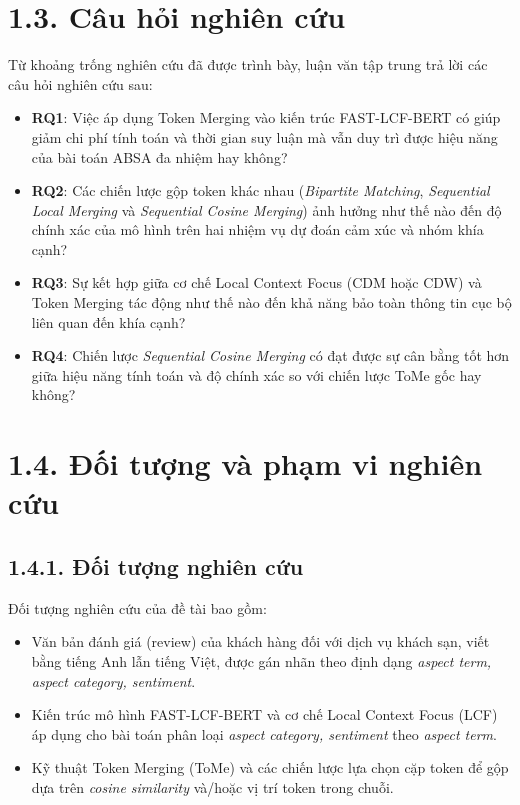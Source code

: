 \section{1.3. Câu hỏi nghiên cứu}

Từ khoảng trống nghiên cứu đã được trình bày, luận văn tập trung trả lời các câu hỏi nghiên cứu sau:

\begin{itemize}
    \item \textbf{RQ1}: Việc áp dụng Token Merging vào kiến trúc FAST-LCF-BERT có giúp giảm chi phí tính toán và thời gian suy luận mà vẫn duy trì được hiệu năng của bài toán ABSA đa nhiệm hay không?

    \item \textbf{RQ2}: Các chiến lược gộp token khác nhau (\textit{Bipartite Matching}, \textit{Sequential Local Merging} và \textit{Sequential Cosine Merging}) ảnh hưởng như thế nào đến độ chính xác của mô hình trên hai nhiệm vụ dự đoán cảm xúc và nhóm khía cạnh?

    \item \textbf{RQ3}: Sự kết hợp giữa cơ chế Local Context Focus (CDM hoặc CDW) và Token Merging tác động như thế nào đến khả năng bảo toàn thông tin cục bộ liên quan đến khía cạnh?

    \item \textbf{RQ4}: Chiến lược \textit{Sequential Cosine Merging} có đạt được sự cân bằng tốt hơn giữa hiệu năng tính toán và độ chính xác so với chiến lược ToMe gốc hay không?
\end{itemize}

\section{1.4. Đối tượng và phạm vi nghiên cứu}
 
\subsection{1.4.1. Đối tượng nghiên cứu}
 
Đối tượng nghiên cứu của đề tài bao gồm:
 
\begin{itemize}
  \item Văn bản đánh giá (review) của khách hàng đối với dịch vụ khách sạn, viết bằng tiếng Anh lẫn tiếng Việt, được gán nhãn theo định dạng \textit{aspect term, aspect category, sentiment}.
  \item Kiến trúc mô hình FAST-LCF-BERT và cơ chế Local Context Focus (LCF) áp dụng cho bài toán phân loại \textit{aspect category, sentiment} theo \textit{aspect term}.
  \item Kỹ thuật Token Merging (ToMe) và các chiến lược lựa chọn cặp token để gộp dựa trên \textit{cosine similarity} và/hoặc vị trí token trong chuỗi.
\end{itemize}
 
